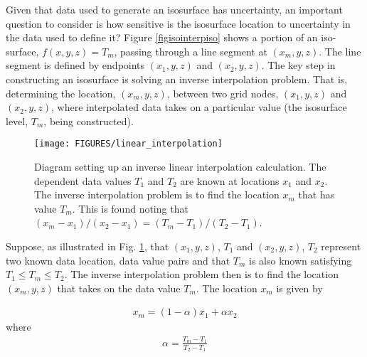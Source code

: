 \documentclass[11pt,twoside]{book}
\begin{document}
Given that data used to generate an isosurface has uncertainty, an
important question to consider is how sensitive is the isosurface
location to uncertainty in the data used to define it? Figure \ref{figisointerpiso}
shows a portion of an iso-surface, $f(x,y,z)=T_m$, passing through a line segment
at $(x_m,y,z)$. The line segment is defined by endpoints $(x_1,y,z)$ and $(x_2,y,z)$.
The key step in constructing an isosurface is solving an inverse interpolation problem.
That is, determining the location, $(x_m,y,z)$, between two grid nodes,
$(x_1,y,z)$ and $(x_2,y,z)$, where interpolated data takes on a particular value
(the isosurface level, $T_m$, being constructed).

\begin{figure}[\figoptions]
\begin{center}
\texttt{[image: FIGURES/linear\_interpolation]}
\end{center}
\caption[Diagram setting up an inverse linear interpolation calculation]
{Diagram setting up an inverse linear interpolation calculation.
The dependent data values $T_1$ and $T_2$ are known at locations $x_1$ and $x_2$.
The inverse interpolation problem is to find the location $x_m$ that has value $T_m$.
This is found noting that $(x_m-x_1)/(x_2-x_1)=(T_m-T_1)/(T_2-T_1)$.
 }
\label{figisointerp}%
\end{figure}

Suppose, as illustrated in Fig. \ref{figisointerp}, that $(x_1,y,z)$, $T_1$ and
$(x_2,y,z)$, $T_2$ represent two known data location, data value pairs and
that $T_m$ is also known satisfying $T_1\le T_m \le T_2$.  The inverse
interpolation problem then is to find the location $(x_m,y,z)$ that takes on
the data value $T_m$.  The location $x_m$ is given by

\begin{eqnarray}
x_m=(1-\alpha)x_1+\alpha x_2
\end{eqnarray}
where
\begin{eqnarray}
\alpha=\frac{T_m-T_1}{T_2-T_1}
\end{eqnarray}
\end{document}
